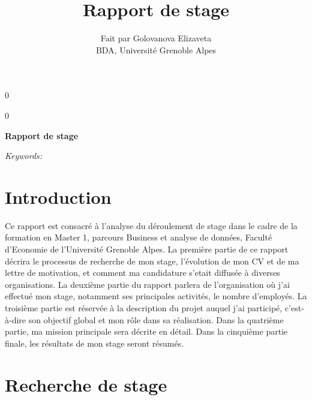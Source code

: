 \documentclass[12pt]{article}
\newcommand{\blind}{0}
\begin{document}
\def\spacingset#1{\renewcommand{\baselinestretch}%
{#1}\small\normalsize} \spacingset{1}



\blind
{
  \title{\bf Rapport de stage}

  \author{
        Fait par Golovanova Elizaveta \\
    BDA, Université Grenoble Alpes\\
      }
  \maketitle
} \fi

\blind
{
  \bigskip
  \bigskip
  \bigskip
  \begin{center}
    {\LARGE\bf Rapport de stage}
  \end{center}
  \medskip
} \fi

\bigskip
\begin{abstract}

\end{abstract}

\noindent%
{\it Keywords:} 
\vfill

\newpage
\spacingset{1.45} %

\newpage
\tableofcontents 
\newpage

\hypertarget{introduction}{%
\section{Introduction}\label{introduction}}

Ce rapport est consacré à l'analyse du déroulement de stage dans le
cadre de la formation en Master 1, parcours Business et analyse de
données, Faculté d'Economie de l'Université Grenoble Alpes. La première
partie de ce rapport décrira le processus de recherche de mon stage,
l'évolution de mon CV et de ma lettre de motivation, et comment ma
candidature s'etait diffusée à diverses organisations. La deuxième
partie du rapport parlera de l'organisation où j'ai effectué mon stage,
notamment ses principales activités, le nombre d'employés. La troisième
partie est réservée à la description du projet auquel j'ai participé,
c'est-à-dire son objectif global et mon rôle dans sa réalisation. Dans
la quatrième partie, ma mission principale sera décrite en détail. Dans
la cinquième partie finale, les résultats de mon stage seront résumés.

\section{Recherche de stage}
\label{sec:first}
\end{document}
